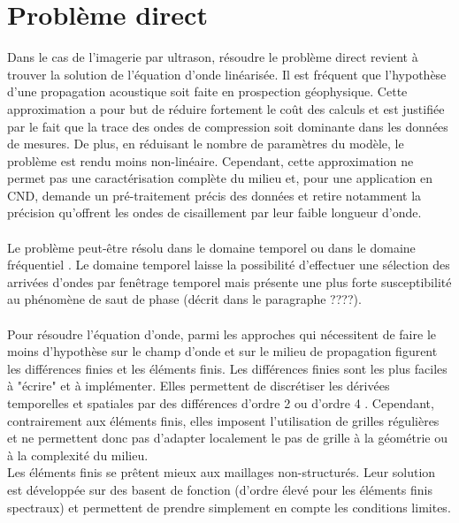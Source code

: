 

\section{Problème direct}

Dans le cas de l'imagerie par ultrason, résoudre le problème direct revient à trouver la solution de l'équation d'onde linéarisée. Il est fréquent que l'hypothèse d'une propagation acoustique soit faite en prospection géophysique. Cette approximation a pour but de réduire fortement le coût des calculs et est justifiée par le fait que la trace des ondes de compression soit dominante dans les données de mesures. De plus, en réduisant le nombre de paramètres du modèle, le problème est rendu moins non-linéaire. Cependant, cette approximation ne permet pas une caractérisation complète du milieu et, pour une application en CND, demande un pré-traitement précis des données et retire notamment la précision qu'offrent les ondes de cisaillement par leur faible longueur d'onde.\\~\\
Le problème peut-être résolu dans le domaine temporel ou dans le domaine fréquentiel \citep{vigh_2008}. Le domaine temporel laisse la possibilité d'effectuer une sélection des arrivées d'ondes par fenêtrage temporel mais présente une plus forte susceptibilité au phénomène de saut de phase (décrit dans le paragraphe ????). \\~\\


 Pour résoudre l'équation d'onde, parmi les approches qui nécessitent de faire le moins d'hypothèse sur le champ d'onde et sur le milieu de propagation figurent les différences finies et les éléments finis. Les différences finies sont les plus faciles à "écrire" et à implémenter. Elles permettent de discrétiser les dérivées temporelles et spatiales par des différences d'ordre 2 \citep{virieux_86} ou d'ordre 4 \citep{levander}. Cependant, contrairement aux éléments finis, elles imposent l'utilisation de grilles régulières et ne permettent donc pas d'adapter localement le pas de grille à la géométrie ou à la complexité du milieu. \\ Les éléments finis se prêtent mieux aux maillages non-structurés. Leur solution est développée sur des basent de fonction (d'ordre élevé pour les éléments finis spectraux) et permettent de prendre simplement en compte les conditions limites.\\
 
